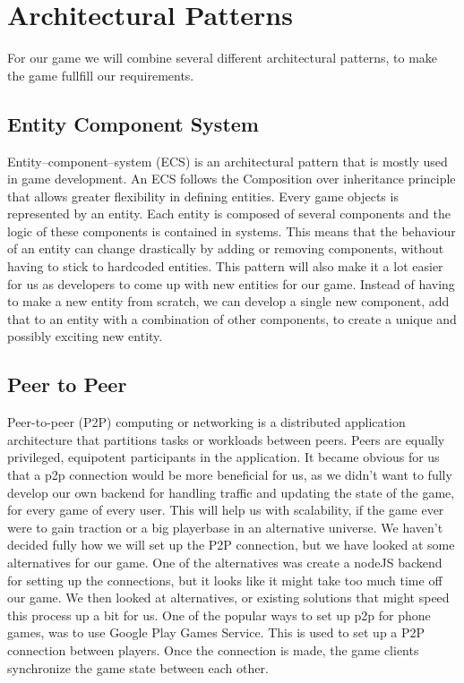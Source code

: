 \section{Architectural Patterns}
For our game we will combine several different architectural patterns, to make the game fullfill our requirements. 

\subsection{Entity Component System}
Entity–component–system (ECS) is an architectural pattern that is mostly used in game development. An ECS follows the Composition over inheritance principle that allows greater flexibility in defining entities. 
Every game objects is represented by an entity. Each entity is composed of several components and the logic of these components is contained in systems. This means that the behaviour of an entity can change drastically by adding or removing components, without having to stick to hardcoded entities.
This pattern will also make it a lot easier for us as developers to come up with new entities for our game. Instead of having to make a new entity from scratch, we can develop a single new component, add that to an entity with a combination of other components, to create a unique and possibly exciting new entity.
	
\subsection{Peer to Peer}
Peer-to-peer (P2P) computing or networking is a distributed application architecture that partitions tasks or workloads between peers. Peers are equally privileged, equipotent participants in the application.
It became obvious for us that a p2p connection would be more beneficial for us, as we didn't want to fully develop our own backend for handling traffic and updating the state of the game, for every game of every user. This will help us with scalability, if the game ever were to gain traction or a big playerbase in an alternative universe.
We haven't decided fully how we will set up the P2P connection, but we have looked at some alternatives for our game.
One of the alternatives was create a nodeJS backend for setting up the connections, but it looks like it might take too much time off our game. We then looked at alternatives, or existing solutions that might speed this process up a bit for us. 
One of the popular ways to set up p2p for phone games, was to use Google Play Games Service. This is used to set up a P2P connection between players. Once the connection is made, the game clients synchronize the game state between each other.

